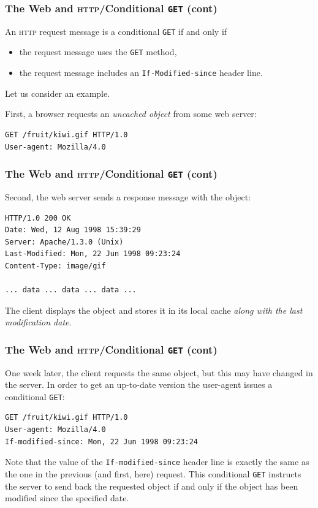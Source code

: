 %
\begin{frame}[containsverbatim]
\frametitle{The Web and \textsc{http}/Conditional \texttt{GET} (cont)}

An \textsc{http} request message is a conditional \texttt{GET} if and
only if
\begin{itemize}

  \item the request message uses the \texttt{GET} method,

  \item the request message includes an \texttt{If-Modified-since}
  header line.

\end{itemize}

Let us consider an example.

\bigskip

First, a browser requests an \emph{uncached object} from some web
server:
{\small
\begin{verbatim}
GET /fruit/kiwi.gif HTTP/1.0
User-agent: Mozilla/4.0
\end{verbatim}
}

\end{frame}

%
\begin{frame}[containsverbatim]
\frametitle{The Web and \textsc{http}/Conditional \texttt{GET} (cont)}

Second, the web server sends a response message with the object:
{\small
\begin{verbatim}
HTTP/1.0 200 OK
Date: Wed, 12 Aug 1998 15:39:29
Server: Apache/1.3.0 (Unix)
Last-Modified: Mon, 22 Jun 1998 09:23:24
Content-Type: image/gif

... data ... data ... data ...
\end{verbatim}
}
The client displays the object and stores it in its local cache
\emph{along with the last modification date}.

\end{frame}

%
\begin{frame}[containsverbatim]
\frametitle{The Web and \textsc{http}/Conditional \texttt{GET} (cont)}

One week later, the client requests the same object, but this may have
changed in the server. In order to get an up-to-date version the
user-agent issues a conditional \texttt{GET}:
{\small
\begin{verbatim}
GET /fruit/kiwi.gif HTTP/1.0
User-agent: Mozilla/4.0
If-modified-since: Mon, 22 Jun 1998 09:23:24
\end{verbatim}
}
Note that the value of the \texttt{If-modified-since} header line is
exactly the same as the one in the previous (and first, here)
request. This conditional \texttt{GET} instructs the server to send
back the requested object if and only if the object has been modified
since the specified date.

\end{frame}

